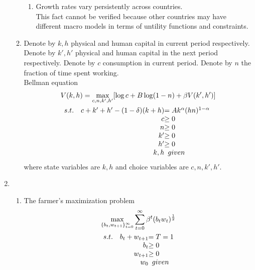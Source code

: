 \documentclass{article}
\begin{document}
\begin{enumerate}
\begin{enumerate}
\begin{enumerate}
                \item Growth rates vary persistently across countries.\\
                This fact cannot be verified because other countries may have different macro models in terms of untility functions and constraints.
            \end{enumerate}
            \item Denote by $k,h$ physical and human capital in current period respectively. Denote by $k',h'$ physical and human capital in the next period respectively.
            Denote by $c$ consumption in current period. Denote by $n$ the fraction of time spent working.\\
            Bellman equation
            \begin{align*}
                &V(k,h)=\max_{c,n,k',h'}[\log c+B\log(1-n)+\beta V(k',h')]\\
                &\begin{array}{r@{\quad}r@{}l}
                    s.t.&c+k'+h'-(1-\delta)(k+h)&=Ak^\alpha(hn)^{1-\alpha}\\
                    &c&\ge0\\
                    &n&\ge0\\
                    &k'&\ge0\\
                    &h'&\ge0\\
                    &k,h&\enspace given
                \end{array}
            \end{align*}
            where state variables are $k,h$ and choice variables are $c,n,k',h'$.
        \end{enumerate}
        \item 
        \begin{enumerate}
            \item The farmer's maximization problem
            \begin{align*}
                &\max_{\{b_t,w_{t+1}\}_{t=0}^\infty}\sum_{t=0}^\infty\beta^t(b_tw_t)^{\frac{1}{2}}\\
                &\begin{array}{r@{\quad}r@{}l}
                s.t.&b_t+w_{t+1}&=T=1\\
                &b_t&\ge0\\
                &w_{t+1}&\ge0\\
                &w_0&\enspace given
                \end{array} 
            \end{align*}

\end{enumerate}
\end{enumerate}
\end{document}
